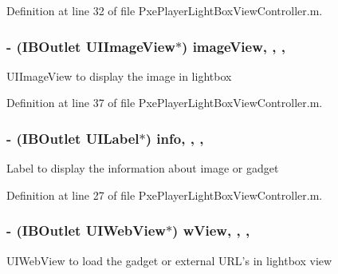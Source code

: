Definition at line 32 of file Pxe\-Player\-Light\-Box\-View\-Controller.\-m.

\hypertarget{category_pxe_player_light_box_view_controller_07_08_a683c2dc890d472035ed660510611b177}{
\subsubsection[{image\-View}]{\setlength{\rightskip}{0pt plus 5cm}-\/ (I\-B\-Outlet U\-I\-Image\-View$\ast$) image\-View\hspace{0.3cm}{\ttfamily [read]}, {\ttfamily [write]}, {\ttfamily [nonatomic]}, {\ttfamily [weak]}}}\label{category_pxe_player_light_box_view_controller_07_08_a683c2dc890d472035ed660510611b177}
U\-I\-Image\-View to display the image in lightbox 

Definition at line 37 of file Pxe\-Player\-Light\-Box\-View\-Controller.\-m.

\hypertarget{category_pxe_player_light_box_view_controller_07_08_a754a4ef5b70d22c93867ef86763deea2}{
\subsubsection[{info}]{\setlength{\rightskip}{0pt plus 5cm}-\/ (I\-B\-Outlet U\-I\-Label$\ast$) info\hspace{0.3cm}{\ttfamily [read]}, {\ttfamily [write]}, {\ttfamily [nonatomic]}, {\ttfamily [weak]}}}\label{category_pxe_player_light_box_view_controller_07_08_a754a4ef5b70d22c93867ef86763deea2}
Label to display the information about image or gadget 

Definition at line 27 of file Pxe\-Player\-Light\-Box\-View\-Controller.\-m.

\hypertarget{category_pxe_player_light_box_view_controller_07_08_a48cc80b9f885fd8abbff0f1ea380582b}{
\subsubsection[{w\-View}]{\setlength{\rightskip}{0pt plus 5cm}-\/ (I\-B\-Outlet U\-I\-Web\-View$\ast$) w\-View\hspace{0.3cm}{\ttfamily [read]}, {\ttfamily [write]}, {\ttfamily [nonatomic]}, {\ttfamily [weak]}}}\label{category_pxe_player_light_box_view_controller_07_08_a48cc80b9f885fd8abbff0f1ea380582b}
U\-I\-Web\-View to load the gadget or external U\-R\-L's in lightbox view 

